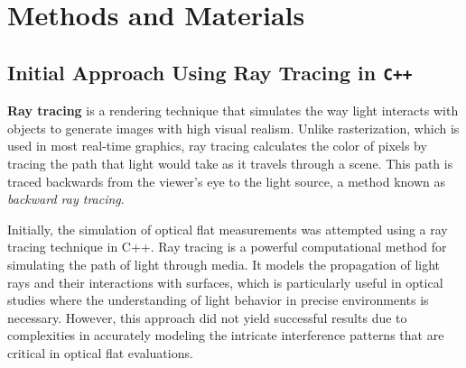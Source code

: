 \documentclass[../main.tex]{subfiles}
\begin{document}
{\let\clearpage\relax\chapter{Methods and Materials}}
\vspace{-5pt}
\section{Initial Approach Using Ray Tracing in \texttt{C++}}
\vspace{-15pt}
\textbf{Ray tracing} is a rendering technique that simulates the way light interacts with objects to generate images with high visual realism. Unlike rasterization, which is used in most real-time graphics, ray tracing calculates the color of pixels by tracing the path that light would take as it travels through a scene. This path is traced backwards from the viewer's eye to the light source, a method known as \textit{backward ray tracing}.

Initially, the simulation of optical flat measurements was attempted using a ray tracing technique in C++. Ray tracing is a powerful computational method for simulating the path of light through media. It models the propagation of light rays and their interactions with surfaces, which is particularly useful in optical studies where the understanding of light behavior in precise environments is necessary. However, this approach did not yield successful results due to complexities in accurately modeling the intricate interference patterns that are critical in optical flat evaluations.
\vspace{-15pt}
\end{document}
